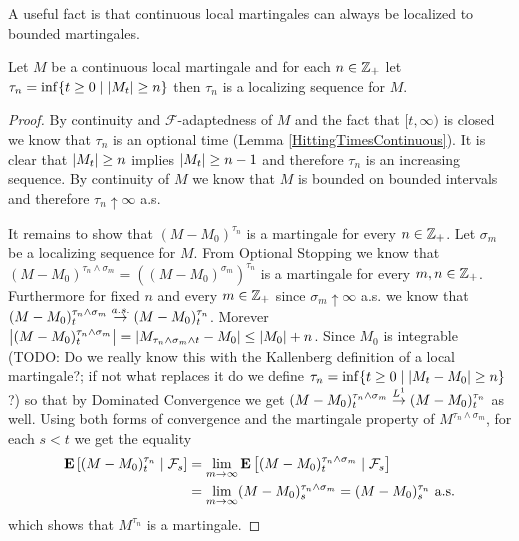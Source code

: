 A useful fact is that continuous local martingales can always be localized to bounded martingales.
\begin{lem}\label{ContinuousLocalMartingaleLocalizeToBounded}Let $M$ be a continuous local martingale and for each $n \in \integers_+$ let $\tau_n = \inf \lbrace t \geq 0 \mid \abs{M_t} \geq n \rbrace$ then $\tau_n$ is a localizing sequence for $M$.
\end{lem}
\begin{proof}
By continuity and $\mathcal{F}$-adaptedness of $M$ and the fact that $[t, \infty)$ is closed we know that $\tau_n$ is an optional time (Lemma \ref{HittingTimesContinuous}). It is clear that $\abs{M_t} \geq n$ implies $\abs{M_t} \geq n-1$ and therefore $\tau_n$ is an increasing sequence.  By continuity of $M$ we know that $M$ is bounded on bounded intervals and therefore $\tau_n \uparrow \infty$ a.s.  

It remains to show that $(M - M_0)^{\tau_n}$ is a martingale for every $n \in \integers_+$.   Let $\sigma_m$ be a localizing sequence for $M$.  From Optional Stopping we know that $(M - M_0)^{\tau_n \wedge \sigma_m} = ((M-M_0)^{\sigma_m})^{\tau_n}$ is a martingale for every $m,n \in \integers_+$.  Furthermore for fixed $n$ and every $m \in \integers_+$ since $\sigma_m \uparrow \infty$ a.s. we know that $(M-M_0)^{\tau_n \wedge \sigma_m}_t \toas (M-M_0)^{\tau_n}_t$.  Morever $\abs{(M-M_0)^{\tau_n \wedge \sigma_m}_t } = \abs{M_{\tau_n \wedge \sigma_m \wedge t} - M_0} \leq \abs{M_0} + n$.  Since $M_0$ is integrable (TODO: Do we really know this with the Kallenberg definition of a local martingale?; if not what replaces it do we define $\tau_n = \inf \lbrace t \geq 0 \mid \abs{M_t - M_0} \geq n \rbrace$?) so that by Dominated Convergence we get $(M-M_0)^{\tau_n \wedge \sigma_m}_t \tolp{1} (M-M_0)^{\tau_n}_t$ as well. Using both forms of convergence and the martingale property of $M^{\tau_n \wedge \sigma_m}$, for each $s < t$ we get the equality
\begin{align*}
\cexpectationlong{\mathcal{F}_s}{(M - M_0)^{\tau_n}_t} &= \lim_{m \to \infty} \cexpectationlong{\mathcal{F}_s}{(M - M_0)^{\tau_n \wedge \sigma_m }_t} \\
&= \lim_{m \to \infty} (M - M_0)^{\tau_n \wedge \sigma_m }_s =  (M - M_0)^{\tau_n }_s \text{ a.s.}
\end{align*}
which shows that $M^{\tau_n}$ is a martingale.
\end{proof}

